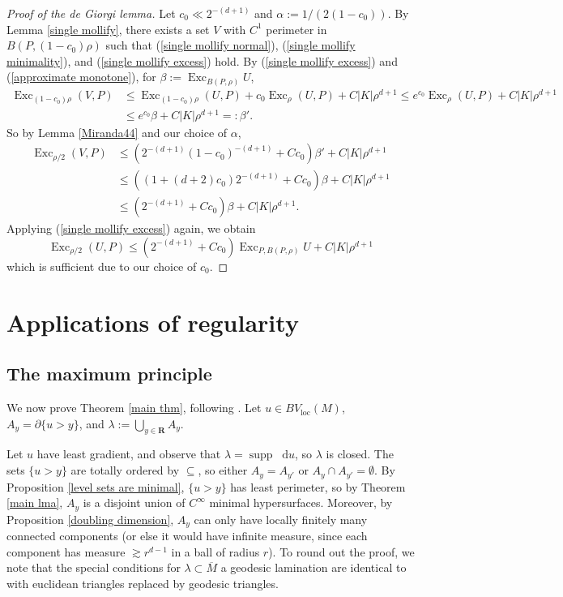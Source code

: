 \documentclass[reqno,10pt]{amsart}
\newcommand{\RR}{\mathbf{R}}
\DeclareMathOperator{\Exc}{Exc}
\DeclareMathOperator{\supp}{supp}
\newcommand*\dif{\mathop{}\!\mathrm{d}}
\newcommand{\loc}{\mathrm{loc}}
\theoremstyle{definition}
\numberwithin{equation}{section}
\begin{document}
\begin{proof}[Proof of the de Giorgi lemma]
Let $c_0 \ll 2^{-(d + 1)}$ and $\alpha := 1/(2(1 - c_0))$.
By Lemma \ref{single mollify}, there exists a set $V$ with $C^1$ perimeter in $B(P, (1 - c_0)\rho)$ such that (\ref{single mollify normal}), (\ref{single mollify minimality}), and (\ref{single mollify excess}) hold.
By (\ref{single mollify excess}) and (\ref{approximate monotone}), for $\beta := \Exc_{B(P, \rho)} U$,
\begin{align*}
\Exc_{(1 - c_0) \rho} (V, P) &\leq \Exc_{(1 - c_0) \rho} (U, P) + c_0 \Exc_\rho (U, P) + C|K| \rho^{d + 1} \leq e^{c_0} \Exc_\rho (U, P) + C |K| \rho^{d + 1} \\
&\leq e^{c_0} \beta + C |K| \rho^{d + 1} =: \beta'.
\end{align*}
So by Lemma \ref{Miranda44} and our choice of $\alpha$,
\begin{align*}
\Exc_{\rho/2} (V, P) &\leq (2^{-(d + 1)} (1 - c_0)^{-(d + 1)} + Cc_0) \beta' + C |K| \rho^{d + 1} \\
&\leq ((1 + (d + 2) c_0) 2^{-(d + 1)} + Cc_0) \beta + C |K| \rho^{d + 1} \\
&\leq (2^{-(d + 1)} + Cc_0) \beta + C |K| \rho^{d + 1}.
\end{align*}
Applying (\ref{single mollify excess}) again, we obtain
$$\Exc_{\rho/2} (U, P) \leq (2^{-(d + 1)} + Cc_0) \Exc_{P, B(P, \rho)} U + C|K|\rho^{d + 1}$$
which is sufficient due to our choice of $c_0$.
\end{proof}


\section{Applications of regularity}\label{GornySec}

\subsection{The maximum principle}\label{Max Princip}
We now prove Theorem \ref{main thm}, following \cite[\S3]{górny2017planar}. Let $u \in BV_\loc(M)$, $A_y = \partial \{u > y\}$, and $\lambda := \bigcup_{y \in \RR} A_y$.

Let $u$ have least gradient, and observe that $\lambda = \supp \dif u$, so $\lambda$ is closed.
The sets $\{u > y\}$ are totally ordered by $\subseteq$, so either $A_y = A_{y'}$ or $A_y \cap A_{y'} = \emptyset$.
By Proposition \ref{level sets are minimal}, $\{u > y\}$ has least perimeter, so by Theorem \ref{main lma}, $A_y$ is a disjoint union of $C^\infty$ minimal hypersurfaces.
Moreover, by Proposition \ref{doubling dimension}, $A_y$ can only have locally finitely many connected components (or else it would have infinite measure, since each component has measure $\gtrsim r^{d - 1}$ in a ball of radius $r$).
To round out the proof, we note that the special conditions for $\lambda \subset \overline M$ a geodesic lamination are identical to \cite[Proposition 3.5]{górny2017planar} with euclidean triangles replaced by geodesic triangles.
\end{document}
